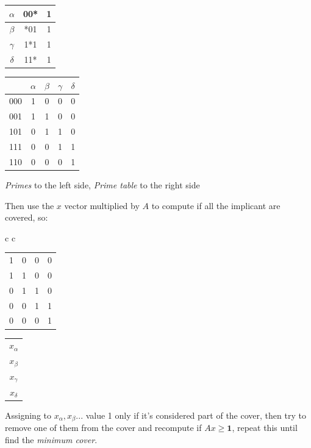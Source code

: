 \begin{center}
	
	\begin{tabular}{|c|c|c|}
		\hline
		$\alpha$ & 00* & 1 \\ \hline
		$\beta$ & *01 & 1 \\ \hline
		$\gamma$ & 1*1 & 1 \\ \hline
		$\delta$ & 11* & 1 \\ \hline
	
	\end{tabular}
	\quad
	\quad
	\quad
	\quad
	\begin{tabular}{|c|c c c c|}
		\hline
		 {} & $\alpha$ & $\beta$ & $\gamma$ & $\delta$ \\ \hline
		 000 & 1 & 0 & 0 & 0 \\ \hline
		 001 & 1 & 1 & 0 & 0 \\ \hline
		 101 & 0 & 1 & 1 & 0 \\ \hline
		 111 & 0 & 0 & 1 & 1 \\ \hline
		 110 & 0 & 0 & 0 & 1 \\ \hline
		 
	\end{tabular}

	\bigskip
	
	\textit{Primes} to the left side, \textit{Prime table} to the right side
\end{center}

Then use the $x$ vector multiplied by $A$ to compute if all the implicant are covered, so:

\begin{center}
	
	\begin{tabular}{ c c }
	
		\begin{tabular}{|c c c c|}
			
			1 & 0 & 0 & 0 \\
			1 & 1 & 0 & 0 \\ 
			0 & 1 & 1 & 0 \\ 
			0 & 0 & 1 & 1 \\ 
			0 & 0 & 0 & 1 \\ 

			
		\end{tabular}
		
	\quad
	\quad
	
		\begin{tabular}{|c|}
			
			$x_{\alpha}$ \\
			$x_{\beta}$ \\
			$x_{\gamma}$ \\
			$x_{\delta}$ \\
			
		\end{tabular}
		
	\end{tabular}
	\bigskip
	
	Assigning to $x_{\alpha}, x_{\beta} ... $ value 1 only if it's considered part of the cover, then try to remove one of them from the cover and recompute if $Ax \geqslant \textbf{1}$, repeat this until find the \textit{minimum cover}.
\end{center}
